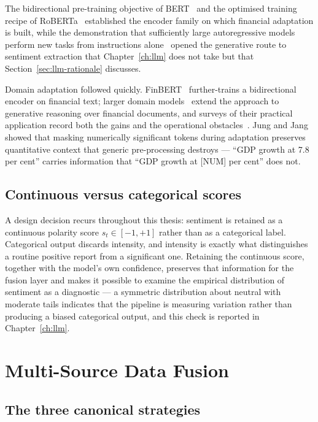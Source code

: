 The bidirectional pre-training objective of BERT~\cite{devlin2019bert} and the optimised
training recipe of RoBERTa~\cite{liu2019roberta} established the encoder family on which
financial adaptation is built, while the demonstration that sufficiently large autoregressive
models perform new tasks from instructions alone~\cite{brown2020gpt3} opened the generative route
to sentiment extraction that Chapter~\ref{ch:llm} does not take but that
Section~\ref{sec:llm-rationale} discusses.

Domain adaptation followed quickly. FinBERT~\cite{araci2019} further-trains a bidirectional
encoder on financial text; larger domain models~\cite{wu2023bloomberggpt,yang2023fingpt,
wang2024fingptbench} extend the approach to generative reasoning over financial documents, and
surveys of their practical application record both the gains and the operational
obstacles~\cite{khan2024chatgpt}. Jung and Jang~\cite{jung2024} showed that masking numerically
significant tokens during adaptation preserves quantitative context that generic pre-processing
destroys --- ``GDP growth at 7.8 per cent'' carries information that ``GDP growth at [NUM] per
cent'' does not.

\subsection{Continuous versus categorical scores}

A design decision recurs throughout this thesis: sentiment is retained as a continuous polarity
score $s_t \in [-1,+1]$ rather than as a categorical label. Categorical output discards
intensity, and intensity is exactly what distinguishes a routine positive report from a
significant one. Retaining the continuous score, together with the model's own confidence,
preserves that information for the fusion layer and makes it possible to examine the empirical
distribution of sentiment as a diagnostic --- a symmetric distribution about neutral with
moderate tails indicates that the pipeline is measuring variation rather than producing a biased
categorical output, and this check is reported in Chapter~\ref{ch:llm}.

\section{Multi-Source Data Fusion}

\subsection{The three canonical strategies}

